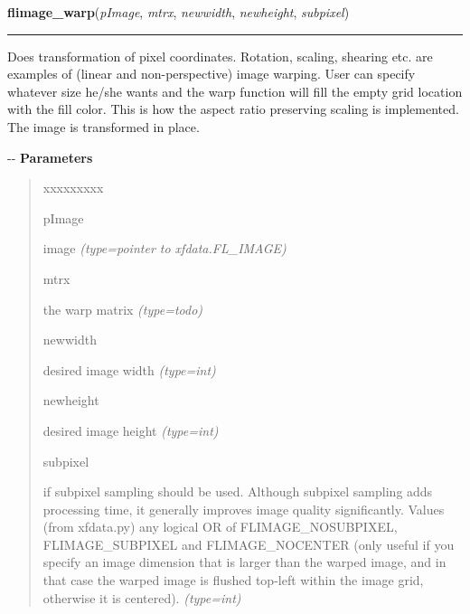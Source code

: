 \hspace{.8\funcindent}\begin{boxedminipage}{\funcwidth}

    \raggedright \textbf{flimage\_warp}(\textit{pImage}, \textit{mtrx}, \textit{newwidth}, \textit{newheight}, \textit{subpixel})

    \vspace{-1.5ex}

    \rule{\textwidth}{0.5\fboxrule}
\setlength{\parskip}{2ex}

Does transformation of pixel coordinates. Rotation, scaling, shearing
etc. are examples of (linear and non-perspective) image warping. User can
specify whatever size he/she wants and the warp function will fill the
empty grid location with the fill color. This is how the aspect ratio
preserving scaling is implemented. The image is transformed in place.

-{}-
\setlength{\parskip}{1ex}
      \textbf{Parameters}
      \vspace{-1ex}

      \begin{quote}
        \begin{Ventry}{xxxxxxxxx}

          \item[pImage]


image
            {\it (type=pointer to xfdata.FL\_IMAGE)}

          \item[mtrx]


the warp matrix
            {\it (type=\emph{todo})}

          \item[newwidth]


desired image width
            {\it (type=int)}

          \item[newheight]


desired image height
            {\it (type=int)}

          \item[subpixel]


if subpixel sampling should be used. Although subpixel sampling adds
processing time, it generally improves image quality significantly.
Values (from xfdata.py) any logical OR of FLIMAGE\_NOSUBPIXEL,
FLIMAGE\_SUBPIXEL and FLIMAGE\_NOCENTER (only useful if you specify an
image dimension that is larger than the warped image, and in that
case the warped image is flushed top-left within the image grid,
otherwise it is centered).
            {\it (type=int)}


\end{Ventry}
\end{quote}
\end{boxedminipage}
